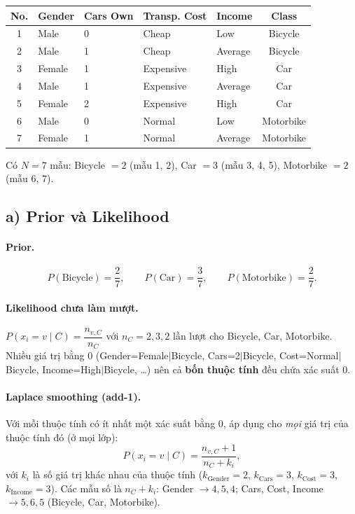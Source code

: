 \documentclass[a4paper,11pt]{article}
\begin{document}
\begin{center}
\begin{tabular}{@{}cllllc@{}}
\toprule
No. & Gender & Cars Own & Transp. Cost & Income & Class \\
\midrule
1 & Male & 0 & Cheap & Low & Bicycle \\
2 & Male & 1 & Cheap & Average & Bicycle \\
3 & Female & 1 & Expensive & High & Car \\
4 & Male & 1 & Expensive & Average & Car \\
5 & Female & 2 & Expensive & High & Car \\
6 & Male & 0 & Normal & Low & Motorbike \\
7 & Female & 1 & Normal & Average & Motorbike \\
\bottomrule
\end{tabular}
\end{center}
Có $N=7$ mẫu: Bicycle $=2$ (mẫu 1, 2), Car $=3$ (mẫu 3, 4, 5), Motorbike $=2$ (mẫu 6, 7).

\subsection*{a) Prior và Likelihood}
\paragraph{Prior.}
\[
P(\text{Bicycle})=\frac27,\qquad P(\text{Car})=\frac37,\qquad P(\text{Motorbike})=\frac27 .
\]

\paragraph{Likelihood chưa làm mượt.} $P(x_i=v\mid C)=\dfrac{n_{v,C}}{n_C}$ với $n_C=2,3,2$ lần lượt cho Bicycle, Car, Motorbike. Nhiều giá trị bằng $0$ (Gender=Female$\mid$Bicycle, Cars=2$\mid$Bicycle, Cost=Normal$\mid$Bicycle, Income=High$\mid$Bicycle, \dots) nên cả \textbf{bốn thuộc tính} đều chứa xác suất $0$.

\paragraph{Laplace smoothing (add-1).} Với mỗi thuộc tính có ít nhất một xác suất bằng $0$, áp dụng cho \emph{mọi} giá trị của thuộc tính đó (ở mọi lớp):
\[
P(x_i=v\mid C)=\frac{n_{v,C}+1}{n_C+k_i},
\]
với $k_i$ là số giá trị khác nhau của thuộc tính ($k_{\text{Gender}}=2$, $k_{\text{Cars}}=3$, $k_{\text{Cost}}=3$, $k_{\text{Income}}=3$). Các mẫu số là $n_C+k_i$: Gender $\to 4,5,4$; Cars, Cost, Income $\to 5,6,5$ (Bicycle, Car, Motorbike).
\end{document}
